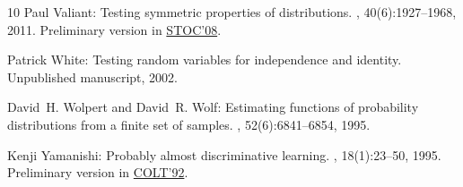 \begin{thebibliography}{10}
{\sc Paul Valiant}: Testing symmetric properties of distributions.
, 40(6):1927--1968, 2011.
\newblock Preliminary version in
  \href{http://dx.doi.org/10.1145/1374376.1374432}{STOC'08}.
\newblock [\epfmtdoi{10.1137/080734066}]

{\sc Patrick White}: Testing random variables for independence and identity.
\newblock Unpublished manuscript, 2002.

{\sc David~H. Wolpert and David~R. Wolf}: Estimating functions of probability
  distributions from a finite set of samples.
, 52(6):6841--6854, 1995.

{\sc Kenji Yamanishi}: Probably almost discriminative learning.
, 18(1):23--50, 1995.
\newblock Preliminary version in
  \href{http://dx.doi.org/10.1145/130385.130404}{COLT'92}.
\newblock [\epfmtdoi{10.1007/BF00993820}]

\end{thebibliography}

